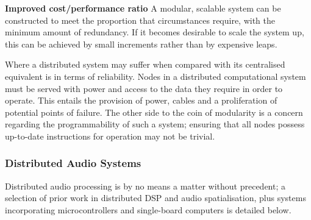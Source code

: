 \textbf{Improved cost/performance ratio}
A modular, scalable system can be constructed to meet the proportion that
circumstances require, with the minimum amount of redundancy.
If it becomes desirable to scale the system up, this can be achieved by small
increments rather than by expensive leaps.


Where a distributed system may suffer when compared with its centralised
equivalent is in terms of reliability.
Nodes in a distributed computational system must be served with power and access
to the data they require in order to operate.
This entails the provision of power, cables and a proliferation of potential
points of failure.
The other side to the coin of modularity is a concern regarding the
programmability of such a system;
ensuring that all nodes possess up-to-date instructions for operation may not be
trivial.

\subsubsection{Distributed Audio Systems}\label{subsec:distributed-audio-systems}

Distributed audio processing is by no means a matter without precedent;
a selection of prior work in distributed DSP and audio spatialisation, plus
systems incorporating microcontrollers and single-board computers is detailed
below.

